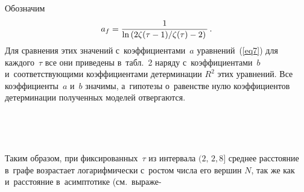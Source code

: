 \begin{multicols}{2}
Обозначим 
$$
a_f=\displaystyle\frac{\displaystyle 1\mathstrut}{\displaystyle \ln\left({2\zeta(\tau-1)}/{\zeta(\tau)}-2\right)\mathstrut}\,.
$$
 Для сравнения этих
значений с~коэффициентами~$a$ уравнений~(\ref{eq7}) для каждого~$\tau$ все они приведены
в~табл.~2 наряду с~коэффициентами~$b$ и~со\-от\-вет\-ст\-ву\-ющи\-ми коэффициентами детерминации
$R^2$ этих уравнений. Все коэффициенты~$a$ и~$b$ значимы, а~гипотезы о~ра\-венст\-ве нулю коэффициентов
детерминации полученных моделей отвергаются.


\setcounter{figure}{4}
\begin{figure*}[b] %
\vspace*{1pt}
\begin{minipage}[t]{81mm}
\begin{center}
   \mbox{%
\epsfxsize=80mm
}
\end{center}
\vspace*{-13pt}
\end{minipage}
\hfill
\vspace*{1pt}
\begin{minipage}[t]{79.94mm}
\begin{center}
   \mbox{%
\epsfxsize=78.94mm
}
\end{center}
\vspace*{-13pt}
\end{minipage}
\end{figure*}

Таким образом, при фиксированных~$\tau$ из интервала $(2,\,2{,}8]$ сред\-нее рас\-сто\-яние в~графе
возрастает логарифмически с~рос\-том чис\-ла его вершин $N$, так
же как и~рас\-сто\-яние в~асимп\-то\-ти\-ке
(см.\ выраже-\linebreak\vspace*{-12pt}

\begin{center}


\end{center}
\end{multicols}
